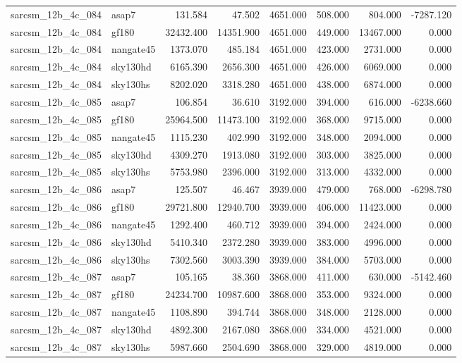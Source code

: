 \begin{tabular}{llrrrrrr}
sarcsm\_12b\_4c\_084 & asap7 & 131.584 & 47.502 & 4651.000 & 508.000 & 804.000 & -7287.120 \\
sarcsm\_12b\_4c\_084 & gf180 & 32432.400 & 14351.900 & 4651.000 & 449.000 & 13467.000 & 0.000 \\
sarcsm\_12b\_4c\_084 & nangate45 & 1373.070 & 485.184 & 4651.000 & 423.000 & 2731.000 & 0.000 \\
sarcsm\_12b\_4c\_084 & sky130hd & 6165.390 & 2656.300 & 4651.000 & 426.000 & 6069.000 & 0.000 \\
sarcsm\_12b\_4c\_084 & sky130hs & 8202.020 & 3318.280 & 4651.000 & 438.000 & 6874.000 & 0.000 \\
sarcsm\_12b\_4c\_085 & asap7 & 106.854 & 36.610 & 3192.000 & 394.000 & 616.000 & -6238.660 \\
sarcsm\_12b\_4c\_085 & gf180 & 25964.500 & 11473.100 & 3192.000 & 368.000 & 9715.000 & 0.000 \\
sarcsm\_12b\_4c\_085 & nangate45 & 1115.230 & 402.990 & 3192.000 & 348.000 & 2094.000 & 0.000 \\
sarcsm\_12b\_4c\_085 & sky130hd & 4309.270 & 1913.080 & 3192.000 & 303.000 & 3825.000 & 0.000 \\
sarcsm\_12b\_4c\_085 & sky130hs & 5753.980 & 2396.000 & 3192.000 & 313.000 & 4332.000 & 0.000 \\
sarcsm\_12b\_4c\_086 & asap7 & 125.507 & 46.467 & 3939.000 & 479.000 & 768.000 & -6298.780 \\
sarcsm\_12b\_4c\_086 & gf180 & 29721.800 & 12940.700 & 3939.000 & 406.000 & 11423.000 & 0.000 \\
sarcsm\_12b\_4c\_086 & nangate45 & 1292.400 & 460.712 & 3939.000 & 394.000 & 2424.000 & 0.000 \\
sarcsm\_12b\_4c\_086 & sky130hd & 5410.340 & 2372.280 & 3939.000 & 383.000 & 4996.000 & 0.000 \\
sarcsm\_12b\_4c\_086 & sky130hs & 7302.560 & 3003.390 & 3939.000 & 384.000 & 5703.000 & 0.000 \\
sarcsm\_12b\_4c\_087 & asap7 & 105.165 & 38.360 & 3868.000 & 411.000 & 630.000 & -5142.460 \\
sarcsm\_12b\_4c\_087 & gf180 & 24234.700 & 10987.600 & 3868.000 & 353.000 & 9324.000 & 0.000 \\
sarcsm\_12b\_4c\_087 & nangate45 & 1108.890 & 394.744 & 3868.000 & 348.000 & 2128.000 & 0.000 \\
sarcsm\_12b\_4c\_087 & sky130hd & 4892.300 & 2167.080 & 3868.000 & 334.000 & 4521.000 & 0.000 \\
sarcsm\_12b\_4c\_087 & sky130hs & 5987.660 & 2504.690 & 3868.000 & 329.000 & 4819.000 & 0.000 \\

\end{tabular}
